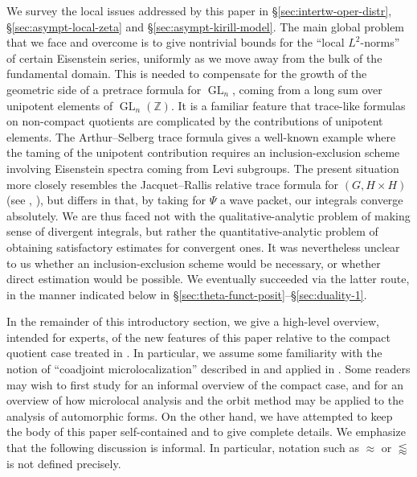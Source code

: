 \documentclass[reqno]{amsart}
\DeclareMathOperator{\GL}{GL}
\theoremstyle{plain} \newtheorem{theorem} {Theorem}
\theoremstyle{definition} \newtheorem{definition} [theorem] {Definition}
\theoremstyle{itplain} %
\numberwithin{equation}{section}
\numberwithin{theorem}{section}
\begin{document}
We survey the local issues addressed by this paper in \S\ref{sec:intertw-oper-distr}, \S\ref{sec:asympt-local-zeta} and \S\ref{sec:asympt-kirill-model}.  The main global problem that we face and overcome is to give nontrivial bounds for the ``local $L^2$-norms'' of certain Eisenstein series, uniformly as we move away from the bulk of the fundamental domain.  This is needed to compensate for the growth of the geometric side of a pretrace formula for $\GL_n$, coming from a long sum over unipotent elements of $\GL_n(\mathbb{Z})$.  It is a familiar feature that trace-like formulas on non-compact quotients are complicated by the contributions of unipotent elements.  The Arthur--Selberg trace formula gives a well-known example where the taming of the unipotent contribution requires an inclusion-exclusion scheme involving Eisenstein spectra coming from Levi subgroups.  The present situation more closely resembles the Jacquet--Rallis relative trace formula for $(G, H \times H)$ (see \cite{MR2767518, MR4195660, MR3947975}, \cite[\S3]{2020arXiv200705601B}), but differs in that, by taking for $\Psi$ a wave packet, our integrals converge absolutely.  We are thus faced not with the qualitative-analytic problem of making sense of divergent integrals, but rather the quantitative-analytic problem of obtaining satisfactory estimates for convergent ones.  It was nevertheless unclear to us whether an inclusion-exclusion scheme would be necessary, or whether direct estimation would be possible.  We eventually succeeded via the latter route, in the manner indicated below in \S\ref{sec:theta-funct-posit}--\S\ref{sec:duality-1}.

In the remainder of this introductory section, we give a high-level overview, intended for experts, of the new features of this paper relative to the compact quotient case treated in \cite{2020arXiv201202187N}.  In particular, we assume some familiarity with the notion of ``coadjoint microlocalization'' described in \cite[\S1]{nelson-venkatesh-1} and applied in \cite{2020arXiv201202187N}.  Some readers may wish to first study \cite[\S2]{2020arXiv201202187N} for an informal overview of the compact case, and \cite[\S1]{nelson-venkatesh-1} for an overview of how microlocal analysis and the orbit method may be applied to the analysis of automorphic forms.  On the other hand, we have attempted to keep the body of this paper self-contained and to give complete details.  We emphasize that the following discussion is informal.  In particular, notation such as $\approx$ or $\lessapprox$ is not defined precisely.
\end{document}
